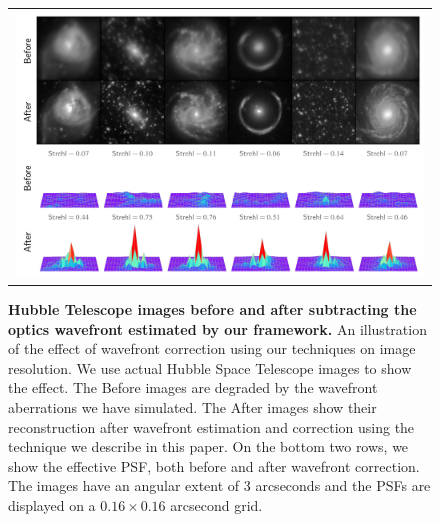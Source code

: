 \begin{figure}[!htbp]
\begin{center}
\begin{tabular}{c}
\includegraphics[width=\textwidth]{figs/interp/results.png}
\end{tabular}
\end{center}
\caption[Todo]{\textbf{Hubble Telescope images before and after subtracting the optics wavefront estimated by our framework.} An illustration of the effect of wavefront correction using our techniques on image resolution.  We use actual Hubble Space Telescope images to show the effect.  The Before images are degraded by the wavefront aberrations we have simulated.  The After images show their reconstruction after wavefront estimation and correction using the technique we describe in this paper. On the bottom two rows, we show the effective PSF, both before and after wavefront correction. The images have an angular extent of 3 arcseconds and the PSFs are displayed on a $0.16 \times 0.16$ arcsecond grid. \label{fig:results}}
\end{figure}